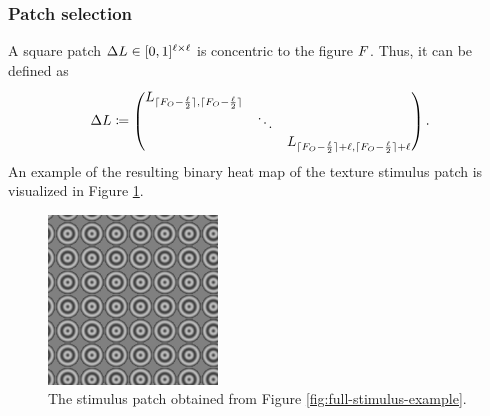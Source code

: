 \subsubsection{Patch selection}
\label{sec:patch-selection}

A square patch $\Delta L \in [0, 1]^{\ell \times \ell}$ is concentric to the figure $F$. Thus, it can be defined as
\begin{equation}
    \Delta L \coloneqq 
    \begin{pmatrix}
        L_{\lceil F_O - \frac{\ell}{2}\rceil, \lceil  F_O - \frac{\ell}{2} \rceil} &  &  \\
         & \ddots &  \\
         &  &  L_{\lceil F_O - \frac{\ell}{2}\rceil + \ell, \lceil  F_O - \frac{\ell}{2}\rceil + \ell}
    \end{pmatrix}.
\end{equation}
An example of the resulting binary heat map of the texture stimulus patch is visualized in Figure \ref{fig:stim-patch-example}.

\begin{figure}
    \centering
    \includegraphics[width=0.4\textwidth]{src/assets/images/stimulus-patch.png}
    \caption{The stimulus patch obtained from Figure \ref{fig:full-stimulus-example}.}
    \label{fig:stim-patch-example}
\end{figure}







